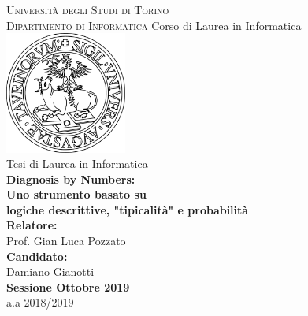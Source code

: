 
\begin{titlepage}
    \pagestyle{empty}
    \begin{center}
        \LARGE{\textsc{Università degli Studi di Torino}}                           \\
        \Large{\textsc{Dipartimento di Informatica}}
        \vskip 10pt
        \Large{\textsc Corso di Laurea in Informatica}                              \\
        \vskip 20pt
        \includegraphics[width=4cm]{immagini/logo_unito.pdf}                        \\
        \vskip 20pt
        \Large{Tesi di Laurea in Informatica}                                       \\
        \vskip 40pt
        \LARGE{\textbf{Diagnosis by Numbers: }}                                             \\
        \LARGE{\textbf{Uno strumento basato su}}                                   \\
        \LARGE{\textbf{logiche descrittive, "tipicalità" e probabilità}}                                      \\
        \vskip 30pt
        \Large{\textbf{Relatore:}}               \\
        \Large{Prof. Gian Luca Pozzato}          \\
        \vskip 30pt
        \Large{\textbf{Candidato:}}                                                  \\
        \Large{Damiano Gianotti}                                                       \\
        \vskip 40pt
        \textbf{Sessione Ottobre 2019}                                               \\
        a.a 2018/2019
    \end{center}
\end{titlepage}
\thispagestyle{empty}\cleardoublepage